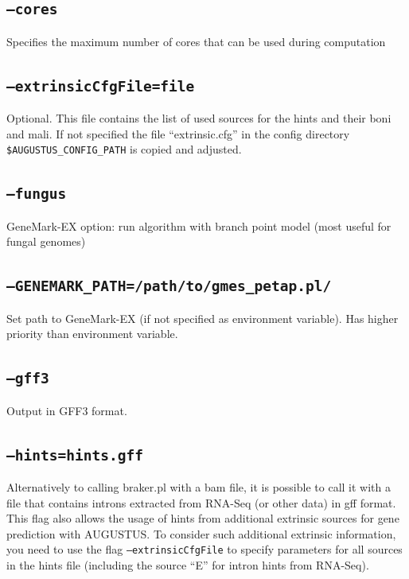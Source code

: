 \documentclass[a4paper,10pt]{report}
\begin{document}
\subsection{\texttt{--cores}}                              Specifies the maximum number of cores that can be used during 
                                         computation
\subsection{\texttt{--extrinsicCfgFile=file}}              Optional. This file contains the list of used sources for the 
                                         hints and their boni and mali. If not specified the file ``extrinsic.cfg'' 
                                         in the config directory \texttt{\$AUGUSTUS\_CONFIG\_PATH} is copied and adjusted.
\subsection{\texttt{--fungus}}                             GeneMark-EX option: run algorithm with branch point model (most 
                                         useful for fungal genomes)
\subsection{\texttt{--GENEMARK\_PATH=/path/to/gmes\_petap.pl/}}            Set path to GeneMark-EX (if not specified as environment 
 variable). Has higher priority than environment variable.
\subsection{\texttt{--gff3}}                               Output in GFF3 format.
\subsection{\texttt{--hints=hints.gff}}                    Alternatively to calling braker.pl with a bam file, it is 
                                         possible to call it with a file that contains introns extracted 
                                         from RNA-Seq (or other data) in gff format. This flag also allows the usage
                                         of hints from additional extrinsic sources for gene prediction 
                                         with AUGUSTUS. To consider such additional extrinsic information,
                                         you need to use the flag \texttt{--extrinsicCfgFile} to specify parameters for 
                                         all sources in the hints file
                                         (including the source ``E'' for intron hints from RNA-Seq).
\end{document}
